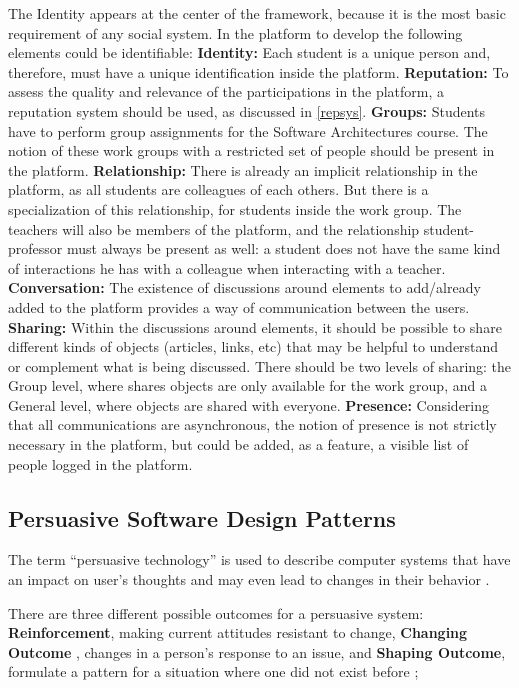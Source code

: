 \documentclass{llncs}
\begin{document}
The Identity appears at the center of the framework, because it is the most basic requirement of any social system.
In the platform to develop the following elements could be identifiable:
\textbf{Identity:} Each student is a unique person and, therefore, must have a unique identification inside the platform.
\textbf{Reputation:} To assess the quality and relevance of the participations in the platform, a reputation system should be used, as discussed in \ref{repsys}.
\textbf{Groups:} Students have to perform group assignments for the Software Architectures course. The notion of these work groups with a restricted set of people should be present in the platform.
\textbf{Relationship:} There is already an implicit relationship in the platform, as all students are colleagues of each others. But there is a specialization of this relationship, for students inside the work group. The teachers will also be members of the platform, and the relationship student-professor must always be present as well: a student does not have the same kind of interactions he has with a colleague when interacting with a teacher.
\textbf{Conversation:} The existence of discussions around elements to add/already added to the platform provides a way of communication between the users.
\textbf{Sharing:} Within the discussions around elements, it should be possible to share different kinds of objects (articles, links, etc) that may be helpful to understand or complement what is being discussed. There should be two levels of sharing: the Group level, where shares objects are only available for the work group, and a General level, where objects are shared with everyone.
\textbf{Presence:} Considering that all communications are asynchronous, the notion of presence is not strictly necessary in the platform, but could be added, as a feature, a visible list of people logged in the platform.

\subsection{Persuasive Software Design Patterns}
The term ``persuasive technology'' is used to describe computer systems that have an impact on user's thoughts and may even lead to changes in their behavior \cite{fogg2002persuasive,oinas2009persuasive}.

There are three different possible outcomes for a persuasive system: \textbf{Reinforcement}, making current attitudes resistant to change, \textbf{Changing Outcome }, changes in a person's response to an issue, and \textbf{Shaping Outcome}, formulate a pattern for a situation where one did not exist before \cite{oinas2008towards};
\end{document}
